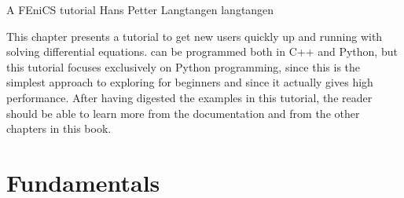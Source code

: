 \newcommand{\langtangenxpoint}{{x}}
\newcommand{\langtangennormalvec}{{n}}
\newcommand{\langtangenep}{\thinspace . }
\newcommand{\para}[1]{\paragraph{#1}}
\newcommand{\langtangenidx}[1]{\index{#1@\emp{#1}}}
\newcommand{\Vghat}{\hat{V}^{(\mbox{g})}}
\newcommand{\Vg}{V^{(\mbox{g})}}
\newcommand{\ue}{u_{\mbox{e}}}
\newcommand{\gln}{\vspace{2mm}\par}

              {A FEniCS tutorial}
              {Hans Petter Langtangen}
              {langtangen}

This chapter presents a \fenics{} tutorial to get new users quickly up and
running with solving differential equations. \fenics{} can be programmed
both in C++ and Python, but this tutorial focuses exclusively on Python
programming, since this is the simplest approach to exploring \fenics{}
for beginners and since it actually gives high performance. After having
digested the examples in this tutorial, the reader should be able to
learn more from the \fenics{} documentation and from the other chapters
in this book.

\section{Fundamentals}
\label{langtangen:fundamentals}

